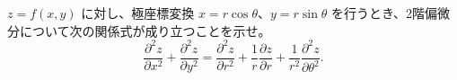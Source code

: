 
$z = f(x,y)$ に対し、極座標変換 $x = r\cos\theta$、$y = r\sin\theta$ を行うとき、2階偏微分について次の関係式が成り立つことを示せ。
\[
\frac{\partial^{2} z}{\partial x^{2}} + \frac{\partial^{2} z}{\partial y^{2}} = \frac{\partial^{2} z}{\partial r^{2}} + \frac{1}{r}\frac{\partial z}{\partial r} + \frac{1}{r^{2}}\frac{\partial^{2} z}{\partial \theta^{2}}.
\]
